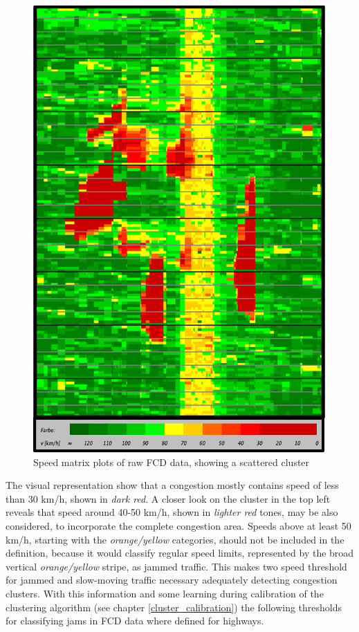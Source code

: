 \documentclass[a4paper,12pt]{report}
\begin{document}
\begin{figure}[h]
	\centering
	\includegraphics[scale=0.8]{./assets/SpeedMatrixPlot_single}
	\caption{Speed matrix plots of raw FCD data, showing a scattered cluster}
	\label{img:speedMatrixPlot_singleCluster}
\end{figure}

The visual representation show that a congestion mostly contains speed of less than 30 km/h, shown in \textit{dark red}. A closer look on the cluster in the top left reveals that speed around 40-50 km/h, shown in \textit{lighter red} tones, may be also considered, to incorporate the complete congestion area. Speeds above at least 50 km/h, starting with the \textit{orange/yellow} categories, should not be included in the definition, because it would classify regular speed limits, represented by the broad vertical \textit{orange/yellow} stripe, as jammed traffic. This makes two speed threshold for jammed and slow-moving traffic necessary adequately detecting congestion clusters. With this information and some learning during calibration of the clustering algorithm (see chapter \ref{cluster_calibration}) the following thresholds for classifying \glspl{jam} in FCD data where defined for highways.
\end{document}

